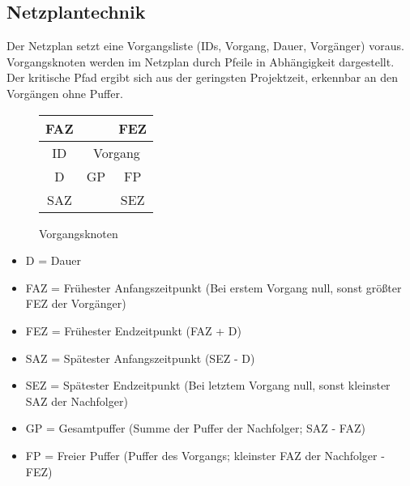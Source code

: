 \subsection{Netzplantechnik}

Der Netzplan setzt eine Vorgangsliste (IDs, Vorgang, Dauer, Vorgänger) voraus. Vorgangsknoten werden im Netzplan durch Pfeile in Abhängigkeit dargestellt. Der kritische Pfad ergibt sich aus der geringsten Projektzeit, erkennbar an den Vorgängen ohne Puffer.

\begin{figure}
    [H]
    \centering
    \begin{tabular}{|c|c|c|}
        \multicolumn{1}{c}{FAZ} & \multicolumn{1}{c}{}         & \multicolumn{1}{c}{FEZ} \\\hline
        ID                      & \multicolumn{2}{c|}{Vorgang}                           \\\hline
        D                       & GP                           & FP                      \\\hline
        \multicolumn{1}{c}{SAZ} & \multicolumn{1}{c}{}         & \multicolumn{1}{c}{SEZ} \\
    \end{tabular}
    \caption{Vorgangsknoten}
\end{figure}

\begin{itemize}
    \item D = Dauer
    \item FAZ = Frühester Anfangszeitpunkt (Bei erstem Vorgang null, sonst größter FEZ der Vorgänger)
    \item FEZ = Frühester Endzeitpunkt (FAZ + D)
    \item SAZ = Spätester Anfangszeitpunkt (SEZ - D)
    \item SEZ = Spätester Endzeitpunkt (Bei letztem Vorgang null, sonst kleinster SAZ der Nachfolger)
    \item GP = Gesamtpuffer (Summe der Puffer der Nachfolger; SAZ - FAZ)
    \item FP = Freier Puffer (Puffer des Vorgangs; kleinster FAZ der Nachfolger - FEZ)
\end{itemize}

